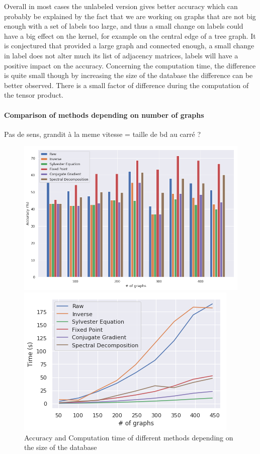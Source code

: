 \documentclass{article}
\theoremstyle{definition}
\begin{document}
Overall in most cases the unlabeled version gives better accuracy which can probably be explained by the fact that we are working on graphs that are not big enough with a set of labels too large, and thus a small change on labels could have a big effect on the kernel, for example on the central edge of a tree graph. It is conjectured that provided a large graph and connected enough, a small change in label does not alter much its list of adjacency matrices, labels will have a positive impact on the accuracy. Concerning the computation time, the difference is quite small though by increasing the size of the database the difference can be better observed. There is a small factor of difference during the computation of the tensor product.
\paragraph{Comparison of methods depending on number of graphs}
Pas de sens, grandit à la meme vitesse = taille de bd au carré ?
\begin{figure}[!htb]
	\begin{multicols}{2}
		\includegraphics[width=\linewidth]{data/nb_graph/acc.png}\par
		\includegraphics[width=\linewidth]{data/nb_graph/time.png}\par
	\end{multicols}
	\caption{Accuracy and Computation time of different methods depending on the size of the database}
\end{figure}
\end{document}
